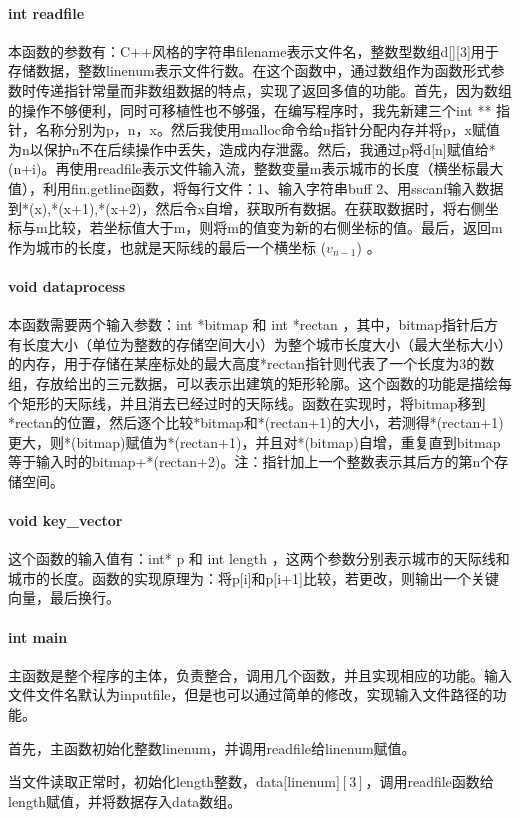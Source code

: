 \documentclass[a4paper]{ctexart}
\begin{document}
	\paragraph{int readfile}
	本函数的参数有：C++风格的字符串filename表示文件名，整数型数组d[][3]用于存储数据，整数linenum表示文件行数。在这个函数中，通过数组作为函数形式参数时传递指针常量而非数组数据的特点，实现了返回多值的功能。首先，因为数组的操作不够便利，同时可移植性也不够强，在编写程序时，我先新建三个int ** 指针，名称分别为p，n，x。然后我使用malloc命令给n指针分配内存并将p，x赋值为n以保护n不在后续操作中丢失，造成内存泄露。然后，我通过p将d[n]赋值给*(n+i)。再使用readfile表示文件输入流，整数变量m表示城市的长度（横坐标最大值），利用fin.getline函数，将每行文件：1、输入字符串buff 2、用sscanf输入数据到*(x),*(x+1),*(x+2)，然后令x自增，获取所有数据。在获取数据时，将右侧坐标与m比较，若坐标值大于m，则将m的值变为新的右侧坐标的值。最后，返回m作为城市的长度，也就是天际线的最后一个横坐标 ($v_{n-1}$) 。
	\paragraph{void dataprocess}
	本函数需要两个输入参数：int *bitmap 和 int *rectan ，其中，bitmap指针后方有长度大小（单位为整数的存储空间大小）为整个城市长度大小（最大坐标大小）的内存，用于存储在某座标处的最大高度*rectan指针则代表了一个长度为3的数组，存放给出的三元数据，可以表示出建筑的矩形轮廓。这个函数的功能是描绘每个矩形的天际线，并且消去已经过时的天际线。函数在实现时，将bitmap移到*rectan的位置，然后逐个比较*bitmap和*(rectan+1)的大小，若测得*(rectan+1)更大，则*(bitmap)赋值为*(rectan+1)，并且对*(bitmap)自增，重复直到bitmap等于输入时的bitmap+*(rectan+2)。注：指针加上一个整数表示其后方的第n个存储空间。
	\paragraph{void key\_vector}
	这个函数的输入值有：int* p 和 int length ，这两个参数分别表示城市的天际线和城市的长度。函数的实现原理为：将p$[$i$]$和p$[$i+1$]$比较，若更改，则输出一个关键向量，最后换行。
	\paragraph{int main}
	主函数是整个程序的主体，负责整合，调用几个函数，并且实现相应的功能。输入文件文件名默认为inputfile，但是也可以通过简单的修改，实现输入文件路径的功能。

	首先，主函数初始化整数linenum，并调用readfile给linenum赋值。
	
	当文件读取正常时，初始化length整数，data$[$linenum$][3]$，调用readfile函数给length赋值，并将数据存入data数组。
	
\end{document}
